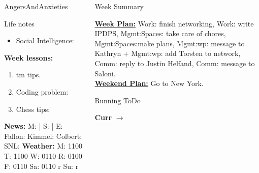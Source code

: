\begin{columns}
\begin{column}{0.20\linewidth}
\begin{block}{AngersAndAnxieties}
\begin{itemize}
      \end{itemize}
    \end{block}
      \begin{block}{Life notes}
        \begin{itemize}
          \tiny \item \tiny Social Intelligence: 
        \end{itemize}
      \end{block}
      \begin{block}
        {\tiny {\bf Week lessons:}}
        \begin{enumerate}
        \item \tiny tm tips.
        \item \tiny Coding problem: 
        \item \tiny Chess tips: 
        \end{enumerate}
            {{\tiny {\tiny \bf  News:}} {\tiny  M:  | S: 
                | E: Fallon:  Kimmel:  Colbert: SNL:}}
            {{\tiny {\tiny \bf  Weather:}} {\tiny M: 1100 T: 1100 W:
                0110 R: 0100 F: 0110 Sa: 0110 r Su: r }}

             
      \end{block}
  \end{column}
  \begin{column}{0.6\linewidth}
    \begin{block}{Week Summary}

      {\underline {\bf Week Plan:} Work: finish networking, Work:
        write IPDPS, Mgmt:Spaces: take care of chores,
        Mgmt:Spaces:make plans, 
        Mgmt:wp: message to Kathryn + Mgmt:wp: add Torsten to network,
        Comm: reply to Justin Helfand, 
        Comm: message to Saloni. 
      } \\
      {\underline{\bf Weekend Plan:} Go to New York. } \\
    \end{block}
    \begin{block}{Running ToDo} %

  
  \item \tiny \textbf{Curr} $\rightarrow$  


\end{block}
\end{column}
\end{columns}
